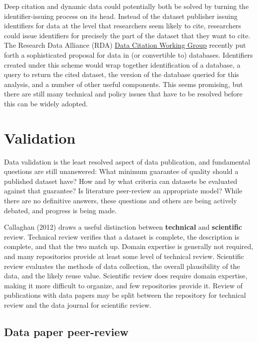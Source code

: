 \documentclass[10pt,twocolumn]{article}
\begin{document}
Deep citation and dynamic data could potentially both be solved by turning the identifier-issuing process on its head.
Instead of the dataset publisher issuing identifiers for data at the level that researchers seem likely to cite, researchers could issue identifiers for precisely the part of the dataset that they want to cite.
The Research Data Alliance (RDA) \href{http://rd-alliance.org/working-groups/data-citation-wg.html}{Data Citation Working Group} recently put forth a sophisticated proposal for data in (or convertible to) databases.
Identifiers created under this scheme would wrap together identification of a database, a query to return the cited dataset, the version of the database queried for this analysis, and a number of other useful components.
This seems promising, but there are still many technical and policy issues that have to be resolved before this can be widely adopted.

\section*{Validation}\label{validation}

Data validation is the least resolved aspect of data publication, and fundamental questions are still unanswered:
What minimum guarantee of quality should a published dataset have? 
How and by what criteria can datasets be evaluated against that guarantee?
Is literature peer-review an appropriate model?
While there are no definitive answers, these questions and others are being actively debated, and progress is being made.

Callaghan (2012)\cite{sarah_callaghan_making_2012} draws a useful distinction between \textbf{technical} and \textbf{scientific} review.
Technical review verifies that a dataset is complete, the description is complete, and that the two match up.
Domain expertise is generally not required, and many repositories provide at least some level of technical review.
Scientific review evaluates the methods of data collection, the overall plausibility of the data, and the likely reuse value.
Scientific review does require domain expertise, making it more difficult to organize, and few repositories provide it.
Review of publications with data papers may be split between the repository for technical review and the data journal for scientific review. 


\subsection*{Data paper peer-review}\label{data-paper-peer-review}
\end{document}
